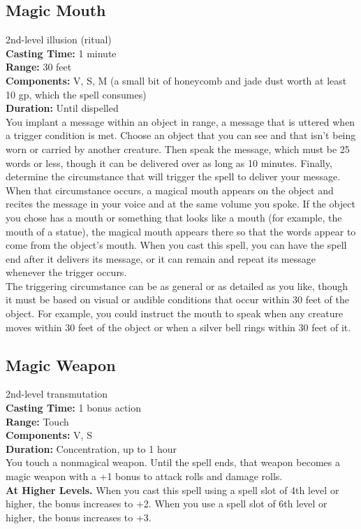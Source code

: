 \documentclass[11pt, A4paper, english]{article}
\begin{document}
		\subsection{Magic Mouth}
2nd-level illusion (ritual) \\
\textbf{Casting Time:} 1 minute \\
\textbf{Range:} 30 feet \\
\textbf{Components:} V, S, M (a small bit of honeycomb and jade dust worth at least 10 gp, which the spell consumes) \\
\textbf{Duration:} Until dispelled \\
You implant a message within an object in range, a message that is uttered when a trigger condition is met. Choose an object that you can see and that isn’t being worn or carried by another creature. Then speak the message, which must be 25 words or less, though it can be delivered over as long as 10 minutes. Finally, determine the circumstance that will trigger the spell to deliver your message. \\
When that circumstance occurs, a magical mouth appears on the object and recites the message in your voice and at the same volume you spoke. If the object you chose has a mouth or something that looks like a mouth (for example, the mouth of a statue), the magical mouth appears there so that the words appear to come from the object’s mouth. When you cast this spell, you can have the spell end after it delivers its message, or it can remain and repeat its message whenever the trigger occurs. \\
The triggering circumstance can be as general or as detailed as you like, though it must be based on visual or audible conditions that occur within 30 feet of the object. For example, you could instruct the mouth to speak when any creature moves within 30 feet of the object or when a silver bell rings within 30 feet of it.

		\subsection{Magic Weapon}
2nd-level transmutation \\
\textbf{Casting Time:} 1 bonus action \\
\textbf{Range:} Touch \\
\textbf{Components:} V, S \\
\textbf{Duration:} Concentration, up to 1 hour \\
You touch a nonmagical weapon. Until the spell ends, that weapon becomes a magic weapon with a +1 bonus to attack rolls and damage rolls. \\
\textbf{At Higher Levels.} When you cast this spell using a spell slot of 4th level or higher, the bonus increases to +2. When you use a spell slot of 6th level or higher, the bonus increases to +3.
\end{document}
